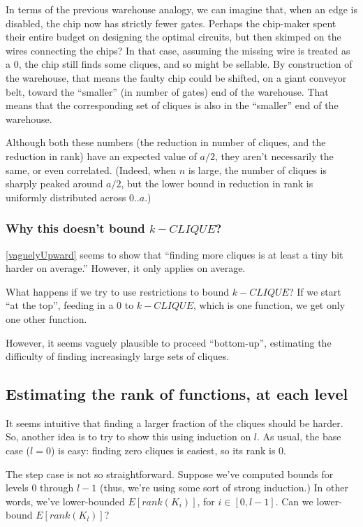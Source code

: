 \documentclass[12pt]{article}
\theoremstyle{definition}
\begin{document}
In terms of the previous warehouse analogy, we can imagine that,
when an edge is disabled, the chip now has strictly fewer gates.
Perhaps the chip-maker spent their entire budget on designing the
optimal circuits, but then skimped on the wires connecting the chips?
In that case, assuming the missing wire is treated as a 0, the chip still
finds some cliques, and so might be sellable.
By construction of the warehouse, that means the faulty chip could be shifted,
on a giant conveyor belt,
toward the ``smaller'' (in number of gates) end of the warehouse.
That means that the corresponding set of cliques is also
in the ``smaller'' end of the warehouse.

Although both these numbers (the reduction in number of cliques, and
the reduction in rank) have an expected value of $a/2$,
they aren't necessarily the same, or even correlated.
(Indeed, when $n$ is large, the number of cliques is sharply peaked around $a/2$,
but the lower bound in reduction in rank is uniformly distributed across $0..a$.)

\subsubsection{Why this doesn't bound $k-CLIQUE$?}

\ref{vaguelyUpward} seems to show that ``finding more cliques is
at least a tiny bit harder on average.'' However, it only applies
on average.

What happens if we try to use restrictions to bound $k-CLIQUE$?
If we start ``at the top'',
feeding in a 0 to $k-CLIQUE$, which is one function,
we get only one other function.

However, it seems vaguely plausible to proceed ``bottom-up'',
estimating the difficulty of finding increasingly large
sets of cliques.

\subsection{Estimating the rank of functions, at each level}

It seems intuitive that finding a larger fraction of the cliques
should be harder.
So, another idea is to try to show this using induction on $l$.
As usual, the base case ($l=0$) is easy: finding zero cliques is easiest,
so its rank is 0.

The step case is not so straightforward. Suppose we've computed bounds for
levels 0 through $l-1$ (thus, we're using some sort of strong induction.)
In other words, we've lower-bounded $E[rank(K_i)]$, for $i \in [0,l-1]$.
Can we lower-bound $E[rank(K_l)]$?
\end{document}
